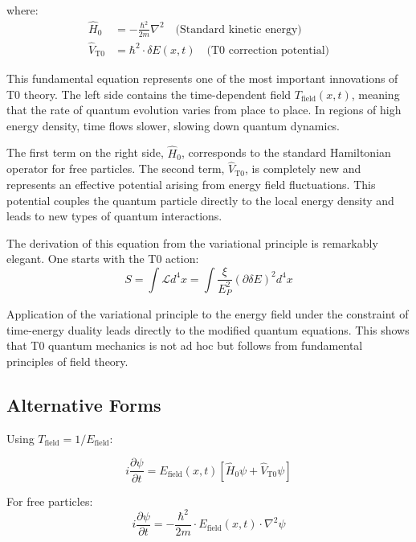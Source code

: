 \documentclass[12pt,a4paper]{article}
\newcommand{\deltaE}{\delta E}
\newcommand{\xipar}{\xi}
\newcommand{\EPlanck}{E_P}
\theoremstyle{definition}
\theoremstyle{remark}
\begin{document}
	where:
	\begin{align}
		\hat{H}_0 &= -\frac{\hbar^2}{2m} \nabla^2 \quad \text{(Standard kinetic energy)} \\
		\hat{V}_{\text{T0}} &= \hbar^2 \cdot \deltaE(x,t) \quad \text{(T0 correction potential)}
	\end{align}
	
	This fundamental equation represents one of the most important innovations of T0 theory. The left side contains the time-dependent field $T_{\text{field}}(x,t)$, meaning that the rate of quantum evolution varies from place to place. In regions of high energy density, time flows slower, slowing down quantum dynamics.
	
	The first term on the right side, $\hat{H}_0$, corresponds to the standard Hamiltonian operator for free particles. The second term, $\hat{V}_{\text{T0}}$, is completely new and represents an effective potential arising from energy field fluctuations. This potential couples the quantum particle directly to the local energy density and leads to new types of quantum interactions.
	
	The derivation of this equation from the variational principle is remarkably elegant. One starts with the T0 action:
	$$S = \int \mathcal{L} d^4x = \int \frac{\xipar}{\EPlanck^2} (\partial \deltaE)^2 d^4x$$
	
	Application of the variational principle to the energy field under the constraint of time-energy duality leads directly to the modified quantum equations. This shows that T0 quantum mechanics is not ad hoc but follows from fundamental principles of field theory.
	
	\subsection{Alternative Forms}
	
	Using $T_{\text{field}} = 1/E_{\text{field}}$:
	
	\begin{equation}
		\boxed{i \frac{\partial\psi}{\partial t} = E_{\text{field}}(x,t) \left[\hat{H}_0 \psi + \hat{V}_{\text{T0}} \psi\right]}
		\label{eq:t0_schrodinger_energy}
	\end{equation}
	
	For free particles:
	\begin{equation}
		\boxed{i \frac{\partial\psi}{\partial t} = -\frac{\hbar^2}{2m} \cdot E_{\text{field}}(x,t) \cdot \nabla^2 \psi}
		\label{eq:t0_schrodinger_free}
	\end{equation}
	
\end{document}
